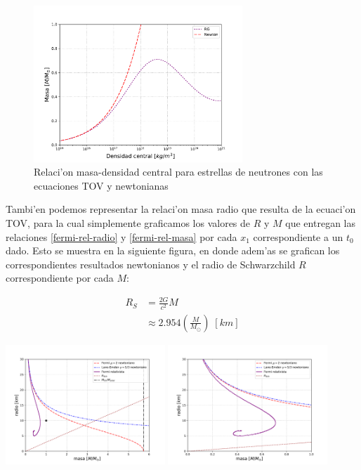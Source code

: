 \begin{figure}[H]
\centering
\includegraphics[angle=0,width=0.7\textwidth]{fig/fig-fermi-rel-masa-densidad.pdf}
\caption{Relaci'on masa-densidad central para estrellas de neutrones con las ecuaciones TOV y newtonianas}\label{grafico-fermi-rel-masa-densidad}
\end{figure}
Tambi'en podemos representar la relaci'on masa radio que resulta de la ecuaci'on TOV, para la cual simplemente graficamos los valores de $R$ y $M$ que entregan las relaciones \eqref{fermi-rel-radio} y \eqref{fermi-rel-masa} por cada $x_1$ correspondiente a un $t_0$ dado. Esto se muestra en la siguiente figura, en donde adem'as se grafican los correspondientes resultados newtonianos y el radio de Schwarzchild $R$ correspondiente por cada $M$:

\begin{align}
 R_S&=\frac{2G}{c^2}M\\
&\approx 2.954 \left(\frac{M}{M_{\odot}}\right)\;[km]
\end{align}

\begin{multicols}{2}
\includegraphics[angle=0,width=0.45\textwidth]{fig/fig-fermi-rel-masa-radio.pdf}
\includegraphics[angle=0,width=0.45\textwidth]{fig/fig-fermi-rel-masa-radio-b.pdf}
\end{multicols}

